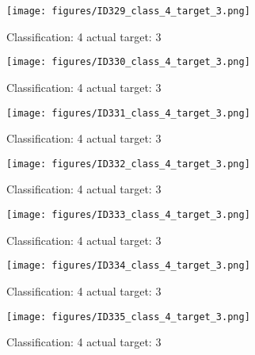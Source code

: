 \begin{figure}[h!]
\begin{center}
\texttt{[image: figures/ID329\_class\_4\_target\_3.png]}
\end{center}
\caption{ Classification: 4 actual target: 3}
\label{fig:ID329_class_4_target_3}
\end{figure}
\begin{figure}[h!]
\begin{center}
\texttt{[image: figures/ID330\_class\_4\_target\_3.png]}
\end{center}
\caption{ Classification: 4 actual target: 3}
\label{fig:ID330_class_4_target_3}
\end{figure}
\begin{figure}[h!]
\begin{center}
\texttt{[image: figures/ID331\_class\_4\_target\_3.png]}
\end{center}
\caption{ Classification: 4 actual target: 3}
\label{fig:ID331_class_4_target_3}
\end{figure}
\begin{figure}[h!]
\begin{center}
\texttt{[image: figures/ID332\_class\_4\_target\_3.png]}
\end{center}
\caption{ Classification: 4 actual target: 3}
\label{fig:ID332_class_4_target_3}
\end{figure}
\begin{figure}[h!]
\begin{center}
\texttt{[image: figures/ID333\_class\_4\_target\_3.png]}
\end{center}
\caption{ Classification: 4 actual target: 3}
\label{fig:ID333_class_4_target_3}
\end{figure}
\begin{figure}[h!]
\begin{center}
\texttt{[image: figures/ID334\_class\_4\_target\_3.png]}
\end{center}
\caption{ Classification: 4 actual target: 3}
\label{fig:ID334_class_4_target_3}
\end{figure}
\begin{figure}[h!]
\begin{center}
\texttt{[image: figures/ID335\_class\_4\_target\_3.png]}
\end{center}
\caption{ Classification: 4 actual target: 3}
\label{fig:ID335_class_4_target_3}
\end{figure}
